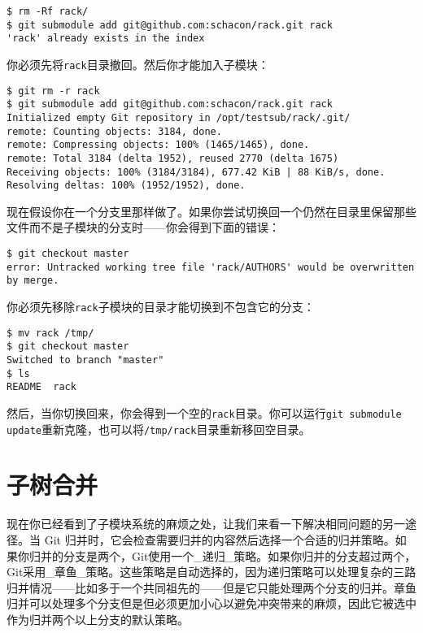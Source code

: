\documentclass[a4paper]{book}
\begin{document}
\begin{shaded}\begin{verbatim}
$ rm -Rf rack/
$ git submodule add git@github.com:schacon/rack.git rack
'rack' already exists in the index
\end{verbatim}\end{shaded}

你必须先将\texttt{rack}目录撤回。然后你才能加入子模块：

\begin{shaded}\begin{verbatim}
$ git rm -r rack
$ git submodule add git@github.com:schacon/rack.git rack
Initialized empty Git repository in /opt/testsub/rack/.git/
remote: Counting objects: 3184, done.
remote: Compressing objects: 100% (1465/1465), done.
remote: Total 3184 (delta 1952), reused 2770 (delta 1675)
Receiving objects: 100% (3184/3184), 677.42 KiB | 88 KiB/s, done.
Resolving deltas: 100% (1952/1952), done.
\end{verbatim}\end{shaded}

现在假设你在一个分支里那样做了。如果你尝试切换回一个仍然在目录里保留那些文件而不是子模块的分支时------你会得到下面的错误：

\begin{shaded}\begin{verbatim}
$ git checkout master
error: Untracked working tree file 'rack/AUTHORS' would be overwritten by merge.
\end{verbatim}\end{shaded}

你必须先移除\texttt{rack}子模块的目录才能切换到不包含它的分支：

\begin{shaded}\begin{verbatim}
$ mv rack /tmp/
$ git checkout master
Switched to branch "master"
$ ls
README	rack
\end{verbatim}\end{shaded}

然后，当你切换回来，你会得到一个空的\texttt{rack}目录。你可以运行\texttt{git submodule update}重新克隆，也可以将\texttt{/tmp/rack}目录重新移回空目录。

\section{子树合并}

现在你已经看到了子模块系统的麻烦之处，让我们来看一下解决相同问题的另一途径。当 Git 归并时，它会检查需要归并的内容然后选择一个合适的归并策略。如果你归并的分支是两个，Git使用一个\_递归\_策略。如果你归并的分支超过两个，Git采用\_章鱼\_策略。这些策略是自动选择的，因为递归策略可以处理复杂的三路归并情况------比如多于一个共同祖先的------但是它只能处理两个分支的归并。章鱼归并可以处理多个分支但是但必须更加小心以避免冲突带来的麻烦，因此它被选中作为归并两个以上分支的默认策略。
\end{document}
